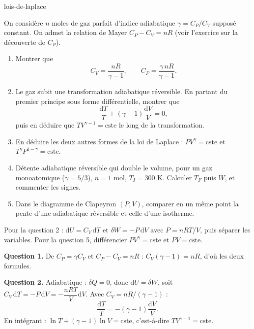 \begin{exo}{lois-de-laplace}

On considère $n$ moles de gaz parfait d'indice adiabatique $\gamma = C_P/C_V$ supposé constant. On admet la relation de Mayer $C_P - C_V = nR$ (voir l'exercice sur la découverte de $C_P$).

\begin{enumerate}
\item Montrer que
\[
C_V = \frac{nR}{\gamma - 1}, \qquad C_P = \frac{\gamma\, nR}{\gamma - 1}.
\]
\item Le gaz subit une transformation adiabatique réversible. En partant du premier principe sous forme différentielle, montrer que
\[
\frac{\mathrm{d}T}{T} + (\gamma - 1)\frac{\mathrm{d}V}{V} = 0,
\]
puis en déduire que $TV^{\gamma-1} = \text{cste}$ le long de la transformation.
\item En déduire les deux autres formes de la loi de Laplace : $PV^\gamma = \text{cste}$ et $T^\gamma P^{1-\gamma} = \text{cste}$.
\item Détente adiabatique réversible qui double le volume, pour un gaz monoatomique ($\gamma = 5/3$), $n = 1$ mol, $T_I = 300$ K. Calculer $T_F$ puis $W$, et commenter les signes.
\item Dans le diagramme de Clapeyron $(P,V)$, comparer en un même point la pente d'une adiabatique réversible et celle d'une isotherme.
\end{enumerate}

\begin{indication}
Pour la question 2 : $\mathrm{d}U = C_V\,\mathrm{d}T$ et $\delta W = -P\,\mathrm{d}V$ avec $P = nRT/V$, puis séparer les variables. Pour la question 5, différencier $PV^\gamma = \text{cste}$ et $PV = \text{cste}$.
\end{indication}

\begin{solution}
\textbf{Question 1.} De $C_P = \gamma C_V$ et $C_P - C_V = nR$ : $C_V(\gamma - 1) = nR$, d'où les deux formules.

\textbf{Question 2.} Adiabatique : $\delta Q = 0$, donc $\mathrm{d}U = \delta W$, soit $C_V\,\mathrm{d}T = -P\,\mathrm{d}V = -\dfrac{nRT}{V}\mathrm{d}V$. Avec $C_V = nR/(\gamma-1)$ :
\[
\frac{\mathrm{d}T}{T} = -(\gamma-1)\frac{\mathrm{d}V}{V}.
\]
En intégrant : $\ln T + (\gamma-1)\ln V = \text{cste}$, c'est-à-dire $TV^{\gamma-1} = \text{cste}$.


\end{solution}
\end{exo}
